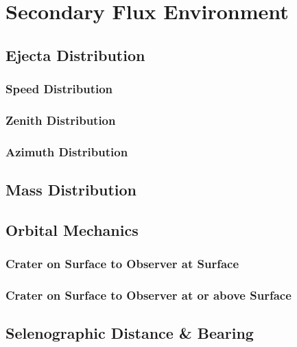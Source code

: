 \documentclass{article}
\begin{document}
\section{Secondary Flux Environment}





\subsection{Ejecta Distribution}


\subsubsection{Speed Distribution}



\subsubsection{Zenith Distribution}


\subsubsection{Azimuth Distribution}


\subsection{Mass Distribution}


\subsection{Orbital Mechanics}

\subsubsection{Crater on Surface to Observer at Surface}

\subsubsection{Crater on Surface to Observer at or above Surface}

\subsection{Selenographic Distance \& Bearing}
\end{document}
